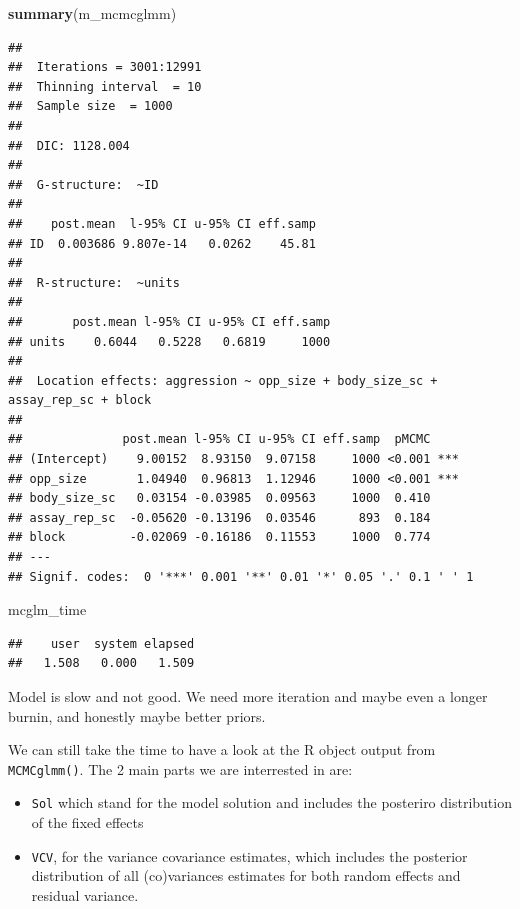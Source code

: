 \documentclass[
  12pt,
]{book}
\newenvironment{Shaded}{\begin{snugshade}}{\end{snugshade}}
\newcommand{\KeywordTok}[1]{\textcolor[rgb]{0.13,0.29,0.53}{\textbf{#1}}}
\newcommand{\NormalTok}[1]{#1}
\providecommand{\tightlist}{%
  \setlength{\itemsep}{0pt}\setlength{\parskip}{0pt}}
\begin{document}
\begin{Shaded}
\begin{Highlighting}[]
\KeywordTok{summary}\NormalTok{(m\_mcmcglmm)}
\end{Highlighting}
\end{Shaded}

\begin{verbatim}
## 
##  Iterations = 3001:12991
##  Thinning interval  = 10
##  Sample size  = 1000 
## 
##  DIC: 1128.004 
## 
##  G-structure:  ~ID
## 
##    post.mean  l-95% CI u-95% CI eff.samp
## ID  0.003686 9.807e-14   0.0262    45.81
## 
##  R-structure:  ~units
## 
##       post.mean l-95% CI u-95% CI eff.samp
## units    0.6044   0.5228   0.6819     1000
## 
##  Location effects: aggression ~ opp_size + body_size_sc + assay_rep_sc + block 
## 
##              post.mean l-95% CI u-95% CI eff.samp  pMCMC    
## (Intercept)    9.00152  8.93150  9.07158     1000 <0.001 ***
## opp_size       1.04940  0.96813  1.12946     1000 <0.001 ***
## body_size_sc   0.03154 -0.03985  0.09563     1000  0.410    
## assay_rep_sc  -0.05620 -0.13196  0.03546      893  0.184    
## block         -0.02069 -0.16186  0.11553     1000  0.774    
## ---
## Signif. codes:  0 '***' 0.001 '**' 0.01 '*' 0.05 '.' 0.1 ' ' 1
\end{verbatim}

\begin{Shaded}
\begin{Highlighting}[]
\NormalTok{mcglm\_time}
\end{Highlighting}
\end{Shaded}

\begin{verbatim}
##    user  system elapsed 
##   1.508   0.000   1.509
\end{verbatim}

Model is slow and not good. We need more iteration and maybe even a longer burnin, and honestly maybe better priors.

We can still take the time to have a look at the R object output from \texttt{MCMCglmm()}. The 2 main parts we are interrested in are:

\begin{itemize}
\tightlist
\item
  \texttt{Sol} which stand for the model solution and includes the posteriro distribution of the fixed effects
\item
  \texttt{VCV}, for the variance covariance estimates, which includes the posterior distribution of all (co)variances estimates for both random effects and residual variance.
\end{itemize}
\end{document}
